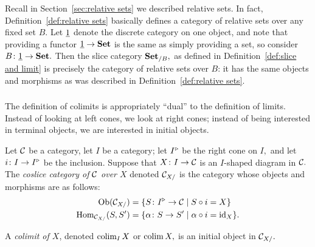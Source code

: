 \documentclass[CT4S-EN-RU]{subfiles}
\begin{document}
\begin{exampleRUS}\label{ex:product version of nat trans}
\end{exampleRUS}

\begin{remarkENG}
Recall in Section~\ref{sec:relative sets} we described relative sets. In fact, Definition~\ref{def:relative sets} basically defines a category of relative sets over any fixed set $B.$ Let $\underline{1}$ denote the discrete category on one object, and note that providing a functor $\underline{1}\rightarrow{\mathbf{Set}}$ is the same as simply providing a set, so consider $B\colon\underline{1}\rightarrow{\mathbf{Set}}.$ Then the slice category ${\mathbf{Set}}_{/B},$ as defined in Definition~\ref{def:slice and limit} is precisely the category of relative sets over $B$: it has the same objects and morphisms as was described in Definition~\ref{def:relative sets}.
\end{remarkENG}

\begin{remarkRUS}
\end{remarkRUS}


\subsubsection{}

\begin{blockENG}
The definition of colimits is appropriately “dual” to the definition of limits. Instead of looking at left cones, we look at right cones; instead of being interested in terminal objects, we are interested in initial objects.
\end{blockENG}

\begin{blockRUS}
\end{blockRUS}

\begin{definitionENG}\label{def:coslice and colimit}
Let $\mathcal{C}$ be a category, let $I$ be a category; let $I^\triangleright$ be the right cone on $I,$ and let $i\colon I\rightarrow I^\triangleright$ be the inclusion. Suppose that $X\colon I\rightarrow\mathcal{C}$ is an $I$-shaped diagram in $\mathcal{C}.$ The {\em coslice category of $\mathcal{C}$ over $X$} denoted $\mathcal{C}_{X/}$ is the category whose objects and morphisms are as follows:
\begin{align*}
\textnormal{Ob}(\mathcal{C}_{X/})&=\{S\colon I^\triangleright\rightarrow\mathcal{C}{\;|\;}S\circ i=X\}\\
\textnormal{Hom}_{\mathcal{C}_{X/}}(S,S')&=\{\alpha\colon S\rightarrow S'{\;|\;}\alpha\circ i=\textnormal{id}_X\}.
\end{align*}

A {\em colimit of $X$}, denoted $\mathop{\textnormal{colim}}_IX$ or $\mathop{\textnormal{colim}} X,$ is an initial object in $\mathcal{C}_{X/}.$
\end{definitionENG}
\end{document}
